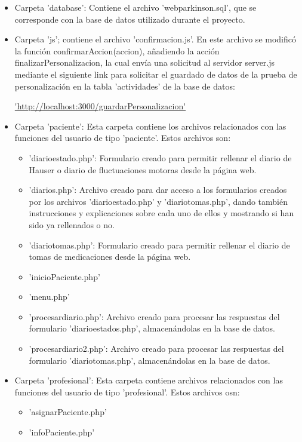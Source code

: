 \begin{itemize}
\begin{itemize}
    \end{itemize}
    \item Carpeta 'database': Contiene el archivo 'webparkinson.sql', que se corresponde con la base de datos utilizado durante el proyecto.
    \item Carpeta 'js'; contiene el archivo 'confirmacion.js'. En este archivo se modificó la función confirmarAccion(accion), añadiendo la acción finalizarPersonalizacion, la cual envía una solicitud al servidor server.js mediante el siguiente link para solicitar el guardado de datos de la prueba de personalización en la tabla 'actividades' de la base de datos:
    
    \url{'http://localhost:3000/guardarPersonalizacion'} 
    \item Carpeta 'paciente': Esta carpeta contiene los archivos relacionados con las funciones del usuario de tipo 'paciente'. Estos archivos son:
    \begin{itemize}
        \item 'diarioestado.php': Formulario creado para permitir rellenar el diario de Hauser o diario de fluctuaciones motoras desde la página web.
        \item 'diarios.php': Archivo creado para dar acceso a los formularios creados por los archivos 'diarioestado.php' y 'diariotomas.php', dando también instrucciones y explicaciones sobre cada uno de ellos y mostrando si han sido ya rellenados o no.
        \item 'diariotomas.php': Formulario creado para permitir rellenar el diario de tomas de medicaciones desde la página web.
        \item 'inicioPaciente.php'
        \item 'menu.php'
        \item 'procesardiario.php': Archivo creado para procesar las respuestas del formulario 'diarioestados.php', almacenándolas en la base de datos.
        \item 'procesardiario2.php': Archivo creado para procesar las respuestas del formulario 'diariotomas.php', almacenándolas en la base de datos.
    \end{itemize}
    \item Carpeta 'profesional': Esta carpeta contiene archivos relacionados con las funciones del usuario de tipo 'profesional'. Estos archivos osn:
    \begin{itemize}
        \item 'asignarPaciente.php'
        \item 'infoPaciente.php'

\end{itemize}
\end{itemize}
